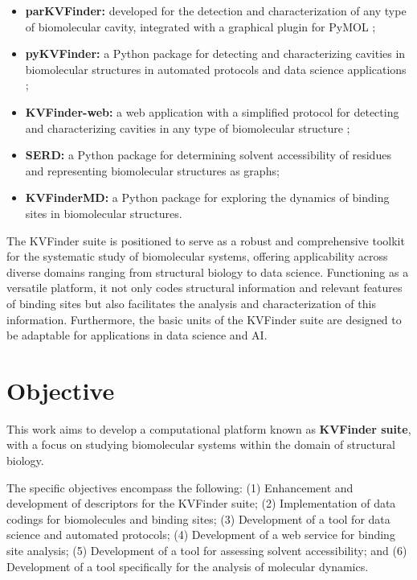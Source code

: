 \documentclass[Ingles]{phdthesis}
\begin{document}
\begin{itemize}
  \item \textbf{parKVFinder:} developed for the detection and characterization of any type of biomolecular cavity, integrated with a graphical plugin for PyMOL \cite{guerra2019,guerra2020};
  \item \textbf{pyKVFinder:} a Python package for detecting and characterizing cavities in biomolecular structures in automated protocols and data science applications \cite{guerra2021};
  \item \textbf{KVFinder-web:} a web application with a simplified protocol for detecting and characterizing cavities in any type of biomolecular structure \cite{guerra2023A};
  \item \textbf{SERD:} a Python package for determining solvent accessibility of residues and representing biomolecular structures as graphs;
  \item \textbf{KVFinderMD:} a Python package for exploring the dynamics of binding sites in biomolecular structures.
\end{itemize}

The KVFinder suite is positioned to serve as a robust and comprehensive toolkit for the systematic study of biomolecular systems, offering applicability across diverse domains ranging from structural biology to data science. Functioning as a versatile platform, it not only codes structural information and relevant features of binding sites but also facilitates the analysis and characterization of this information. Furthermore, the basic units of the KVFinder suite are designed to be adaptable for applications in data science and AI.


\chapter{Objective}

This work aims to develop a computational platform known as \textbf{KVFinder suite}, with a focus on studying biomolecular systems within the domain of structural biology.

The specific objectives encompass the following: (1) Enhancement and development of descriptors for the KVFinder suite; (2) Implementation of data codings for biomolecules and binding sites; (3) Development of a tool for data science and automated protocols; (4) Development of a web service for binding site analysis; (5) Development of a tool for assessing solvent accessibility; and (6) Development of a tool specifically for the analysis of molecular dynamics.
\end{document}
